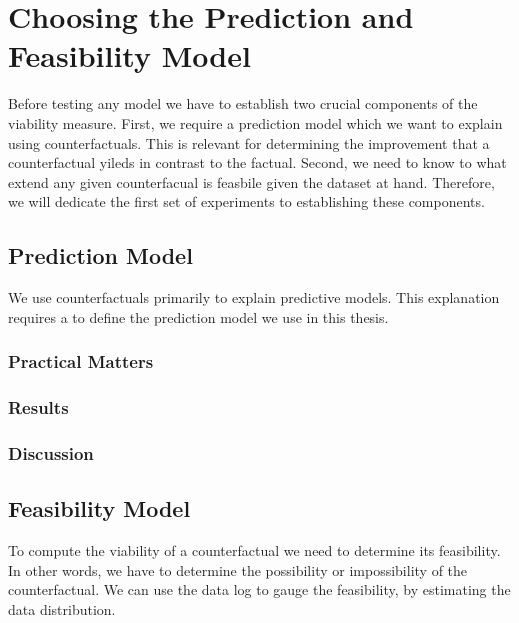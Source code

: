 \documentclass[./../../paper.tex]{subfiles}
\begin{document}
\section{Choosing the Prediction and Feasibility Model}
Before testing any model we have to establish two crucial components of the viability measure. First, we require a prediction model which we want to explain using counterfactuals. This is relevant for determining the improvement that a counterfactual yileds in contrast to the factual. Second, we need to know to what extend any given counterfacual is feasbile given the dataset at hand. Therefore, we will dedicate the first set of experiments to establishing these components.

\subsection{Prediction Model}
We use counterfactuals primarily to explain predictive models. This explanation requires a to define the prediction model we use in this thesis.



\subsubsection{Practical Matters}

\subsubsection{Results}

\subsubsection{Discussion}


\subsection{Feasibility Model}
To compute the viability of a counterfactual we need to determine its feasibility. In other words, we have to determine the possibility or impossibility of the counterfactual. We can use the data log to gauge the feasibility, by estimating the data distribution.
\end{document}
